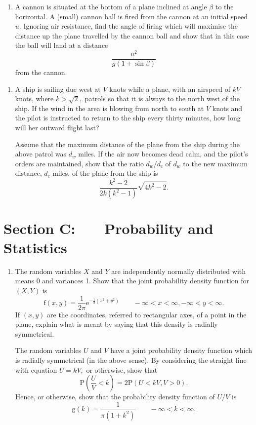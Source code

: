 \documentclass[a4, 11pt]{report}
\newlength{\qspace}
\newcounter{qnumber}
\newenvironment{question}%
 {\vspace{\qspace}
  \begin{enumerate}[\bfseries 1\quad][10]%
    \setcounter{enumi}{\value{qnumber}}%
    \item%
 }
{
  \end{enumerate}
  \filbreak
  \stepcounter{qnumber}
 }
\begin{document}
\begin{question}	
A cannon is situated at the bottom of a plane inclined at angle $\beta$
to the horizontal. A (small) cannon ball is fired from the cannon
at an initial speed $u.$ Ignoring air resistance, find the angle
of firing which will maximise the distance up the plane travelled
by the cannon ball and show that in this case the ball will land at
a distance 
\[
\frac{u^{2}}{g(1+\sin\beta)}
\]
from the cannon.
\end{question}


\begin{question}
A ship is sailing due west at $V$ knots while a plane, with an airspeed
of $kV$ knots, where $k>\sqrt{2},$ patrols so that it is always
to the north west of the ship. If the wind in the area is blowing
from north to south at $V$ knots and the pilot is instructed to return
to the ship every thirty minutes, how long will her outward flight
last? 


Assume that the maximum distance of the plane from the ship during
the above patrol was $d_{w}$ miles. If the air now becomes dead calm,
and the pilot's orders are maintained, show that the ratio $d_{w}/d_{c}$
of $d_{w}$ to the new maximum distance, $d_{c}$ miles, of the plane
from the ship is 
\[
\frac{k^{2}-2}{2k(k^{2}-1)}\sqrt{4k^{2}-2}.
\]
\end{question}
	

	
	\newpage
\section*{Section C: \ \ \ Probability and Statistics}


\begin{question}
The random variables $X$ and $Y$ are independently normally distributed
with means 0 and variances 1. Show that the joint probability density
function for $(X,Y)$ is 
\[
\mathrm{f}(x,y)=\frac{1}{2\pi}\mathrm{e}^{-\frac{1}{2}(x^{2}+y^{2})}\qquad-\infty<x<\infty,-\infty<y<\infty.
\]
If $(x,y)$ are the coordinates, referred to rectangular axes, of
a point in the plane, explain what is meant by saying that this density
is radially symmetrical. 


The random variables $U$ and $V$ have a joint probability density
function which is radially symmetrical (in the above sense). By considering
the straight line with equation $U=kV,$ or otherwise, show that 
\[
\mathrm{P}\left(\frac{U}{V}<k\right)=2\mathrm{P}(U<kV,V>0).
\]
Hence, or otherwise, show that the probability density function of
$U/V$ is 
\[
\mathrm{g}(k)=\frac{1}{\pi(1+k^{2})}\qquad-\infty<k<\infty.
\]
\end{question}
\end{document}
